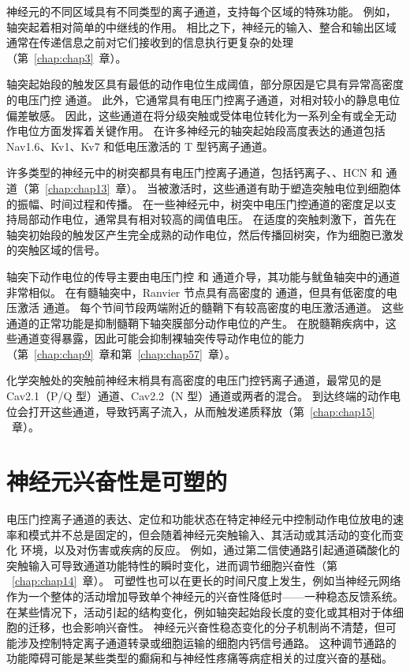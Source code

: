 神经元的不同区域具有不同类型的离子通道，支持每个区域的特殊功能。
例如，轴突起着相对简单的中继线的作用。
相比之下，神经元的输入、整合和输出区域通常在传递信息之前对它们接收到的信息执行更复杂的处理（第~\ref{chap:chap3}~章）。


轴突起始段的触发区具有最低的动作电位生成阈值，部分原因是它具有异常高密度的电压门控  通道。
此外，它通常具有电压门控离子通道，对相对较小的静息电位偏差敏感。
因此，这些通道在将分级突触或受体电位转化为一系列全有或全无动作电位方面发挥着关键作用。
在许多神经元的轴突起始段高度表达的通道包括 Nav1.6、Kv1、Kv7 和低电压激活的 T 型钙离子通道。


许多类型的神经元中的树突都具有电压门控离子通道，包括钙离子、、HCN 和  通道（第~\ref{chap:chap13}~章）。
当被激活时，这些通道有助于塑造突触电位到细胞体的振幅、时间过程和传播。
在一些神经元中，树突中电压门控通道的密度足以支持局部动作电位，通常具有相对较高的阈值电压。
在适度的突触刺激下，首先在轴突初始段的触发区产生完全成熟的动作电位，然后传播回树突，作为细胞已激发的突触区域的信号。


轴突下动作电位的传导主要由电压门控  和  通道介导，其功能与鱿鱼轴突中的通道非常相似。
在有髓轴突中，Ranvier 节点具有高密度的  通道，但具有低密度的电压激活  通道。
每个节间节段两端附近的髓鞘下有较高密度的电压激活通道。
这些  通道的正常功能是抑制髓鞘下轴突膜部分动作电位的产生。 
在脱髓鞘疾病中，这些通道变得暴露，因此可能会抑制裸轴突传导动作电位的能力（第~\ref{chap:chap9}~章和第~\ref{chap:chap57}~章）。


化学突触处的突触前神经末梢具有高密度的电压门控钙离子通道，最常见的是 Cav2.1（P/Q 型）通道、Cav2.2（N 型）通道或两者的混合。
到达终端的动作电位会打开这些通道，导致钙离子流入，从而触发递质释放（第~\ref{chap:chap15} ~章）。



\section{神经元兴奋性是可塑的}

电压门控离子通道的表达、定位和功能状态在特定神经元中控制动作电位放电的速率和模式并不总是固定的，但会随着神经元突触输入、其活动或其活动的变化而变化 环境，以及对伤害或疾病的反应。
例如，通过第二信使通路引起通道磷酸化的突触输入可导致通道功能特性的瞬时变化，进而调节细胞兴奋性（第 ~\ref{chap:chap14}~章）。 
可塑性也可以在更长的时间尺度上发生，例如当神经元网络作为一个整体的活动增加导致单个神经元的兴奋性降低时——一种稳态反馈系统。
在某些情况下，活动引起的结构变化，例如轴突起始段长度的变化或其相对于体细胞的迁移，也会影响兴奋性。
神经元兴奋性稳态变化的分子机制尚不清楚，但可能涉及控制特定离子通道转录或细胞运输的细胞内钙信号通路。 
这种调节通路的功能障碍可能是某些类型的癫痫和与神经性疼痛等病症相关的过度兴奋的基础。




